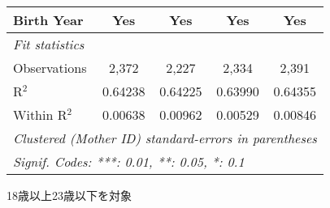 \documentclass{article}
\begin{document}
\begin{landscape}
\begin{threeparttable}[b]
\begin{tabular}{lcccc}
      Birth Year                                    & Yes           & Yes      & Yes      & Yes\\  
      \midrule
      \emph{Fit statistics}\\
      Observations                                  & 2,372         & 2,227    & 2,334    & 2,391\\  
      R$^2$                                         & 0.64238       & 0.64225  & 0.63990  & 0.64355\\  
      Within R$^2$                                  & 0.00638       & 0.00962  & 0.00529  & 0.00846\\  
      \midrule \midrule
      \multicolumn{5}{l}{\emph{Clustered (Mother ID) standard-errors in parentheses}}\\
      \multicolumn{5}{l}{\emph{Signif. Codes: ***: 0.01, **: 0.05, *: 0.1}}\\
   \end{tabular}
   
   \begin{tablenotes}\item 18歳以上23歳以下を対象
   \end{tablenotes}
\end{threeparttable}
\par\endgroup


\end{landscape}
\end{document}
